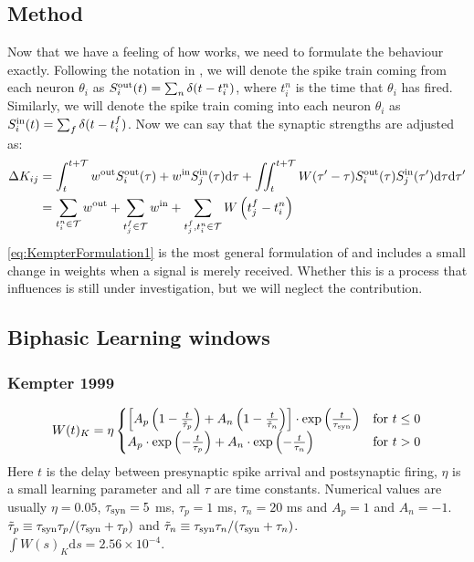 \subsection{Method}
Now that we have a feeling of how \STDP works, we need to formulate the behaviour exactly. Following the notation in \cite{Kempter1999}, we will denote the spike train coming from each neuron $\theta_i$ as $S_i^{\rm out}(t) = \sum_{n} \delta (t-t_{i}^{n})$, where $t_{i}^{n}$ is the time that $\theta_i$ has fired. Similarly, we will denote the spike train coming into each neuron $\theta_i$ as $S_i^{\rm in}(t) = \sum_{f} \delta (t-t_{i}^{f})$. Now we can say that the synaptic strengths are adjusted as:
\begin{align}
\Delta K_{ij} &= \int_{t}^{t+\mathcal{T}} w^{\rm{out}} S_i^{\rm out}(\tau) + w^{\rm{in}} S_{j}^{\rm {in}}(\tau) \mathrm{d}\tau
+ \iint_{t}^{t+\mathcal{T}} W( \tau^\prime - \tau) S_{i}^{\rm out}(\tau) S_{j}^{\rm in}( \tau^\prime) \mathrm{d} \tau \mathrm{d} \tau^\prime
\label{eq:KempterFormulation1} \\
&= \sum_{t_i^{n}\in \mathcal{T}} w^{\mathrm{out}} + \sum_{t_{j}^{f} \in \mathcal{T}} w^{\mathrm{in}} + \sum_{t_{j}^{f}, t_i^{n} \in \mathcal{T}} W\left(t_{j}^{f}-t_i^{n}\right) \label{eq:KempterFormulation2}
\end{align}
\eqref{eq:KempterFormulation1} is the most general formulation of \STDP and includes a small change in weights when a signal is merely received. Whether this is a process that influences \STDP is still under investigation, but we will neglect the contribution.


\subsection{Biphasic Learning windows}
\subsubsection{Kempter 1999}
\begin{align}
W(t)_K = \eta
\begin{cases}
\left[A_{p}\left(1-\frac{t}{\tilde{\tau}_{p}}\right)+A_{n}\left(1-\frac{t}{\tilde{\tau}_{n}}\right)\right] \cdot \exp \left( \frac{t}{\tau_{\rm syn}} \right) & \text{for } t \leq 0 \\
A_{p} \cdot \exp \left(-\frac{t}{\tau_{p}}\right) + A_{n} \cdot \exp \left(-\frac{t}{\tau_{n}} \right) & \text{for } t > 0
\end{cases} \label{eq:learningwindowKempter1999}
\end{align}
Here $t$ is the delay between presynaptic spike arrival and postsynaptic firing, $\eta$ is a small learning parameter and all $\tau$ are time constants. Numerical values are usually  $\eta = 0.05$, $\tau_{\rm syn} = 5$ ms, $\tau_{p} = 1$ ms, $\tau_{n} = 20$ ms and $A_p = 1$ and $A_{n} = -1$. $\tilde{\tau}_{p} \equiv \tau_{\rm syn} \tau_{p} / (\tau_{\rm syn} + \tau_{p})$ and $\tilde{\tau}_{n} \equiv \tau_{\rm syn} \tau_{n} / (\tau_{\rm syn} + \tau_{n})$. \\
$\int W(s)_K \mathrm{d}s = 2.56 \times 10^{-4}$.


